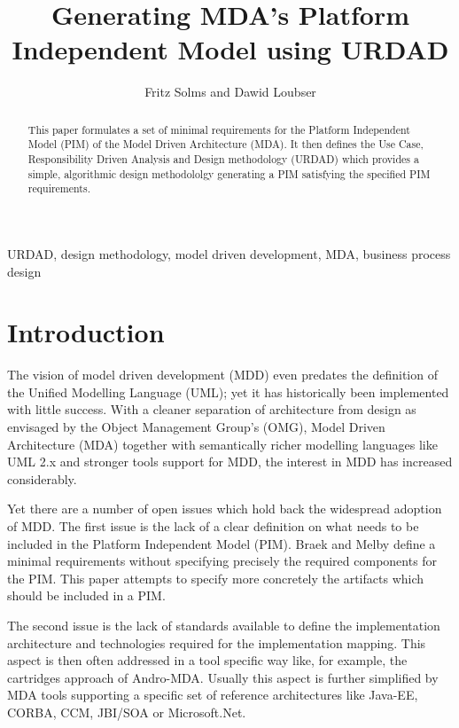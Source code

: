\documentclass[reviewcopy]{elsart}
\begin{document}
\begin{frontmatter}
\title{Generating MDA's Platform Independent Model using URDAD}

\author{Fritz Solms and Dawid Loubser}
\address{Solms Training and Consulting CC, PostNet Suite 237, Private Bag X9,
Melville, 2109, Johannesburg, South Africa.}


\begin{abstract}
  This paper formulates a set of minimal requirements for the
  Platform Independent Model (PIM) of the Model Driven Architecture
  (MDA). It then defines the Use Case, Responsibility Driven Analysis and
  Design methodology (URDAD) which provides a simple, algorithmic
  design methodololgy generating a PIM satisfying the specified PIM
  requirements.
\end{abstract}

\begin{keyword}
URDAD, design methodology, model driven development, MDA, business
process design
\end{keyword}
\end{frontmatter}

\section{Introduction}

The vision of model driven development (MDD)
\cite{schmidt:modelDrivenEngineering,stahl:mdsd}
even predates the definition of the Unified Modelling Language (UML); yet it
has historically been implemented with little success. With a cleaner separation of
architecture from design as envisaged by the Object Management Group's (OMG),
Model Driven Architecture (MDA) \cite{siegel:developingInMDA,frankel:enterpriseMDA}
together with semantically richer modelling languages like UML 2.x and stronger
tools support for MDD, the interest in MDD has increased considerably.

Yet there are a number of open issues which hold back the widespread adoption of MDD.
The first issue is the lack of a clear definition on what needs to be included in the
Platform Independent Model (PIM). Braek and Melby \cite{braek:modelDrivenServiceEngineering}
define a minimal requirements without specifying precisely the required components
for the PIM. This paper attempts to specify more concretely the artifacts which should
be included in a PIM.

The second issue is the lack of standards available to define the implementation architecture
and technologies required for the implementation mapping. This aspect is then often addressed in
a tool specific way like, for example, the cartridges approach of Andro-MDA. Usually this aspect
is further simplified by MDA tools supporting a specific set of reference architectures like
Java-EE, CORBA, CCM, JBI/SOA or Microsoft.Net.
\end{document}
